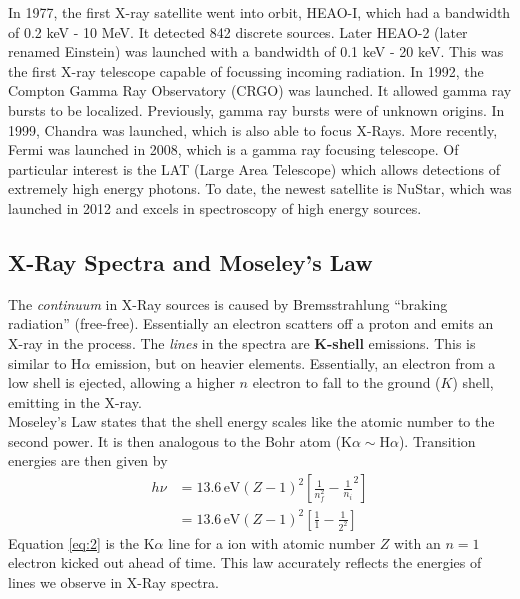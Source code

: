 \documentclass[10pt]{article}
\numberwithin{equation}{section}
\newcommand{\n}{\noindent}
\begin{document}
		\n In 1977, the first X-ray satellite went into orbit, HEAO-I, which had a bandwidth of 0.2 keV - 10 MeV. It detected 842 discrete sources. Later HEAO-2 (later renamed Einstein) was launched with a bandwidth of 0.1 keV - 20 keV. This was the first X-ray telescope capable of focussing incoming radiation. In 1992, the Compton Gamma Ray Observatory (CRGO) was launched. It allowed gamma ray bursts to be localized. Previously, gamma ray bursts were of unknown origins. In 1999, Chandra was launched, which is also able to focus X-Rays. More recently, Fermi was launched in 2008, which is a gamma ray focusing telescope. Of particular interest is the LAT (Large Area Telescope) which allows detections of extremely high energy photons. To date, the newest satellite is NuStar, which was launched in 2012 and excels in spectroscopy of high energy sources.
	\subsection{X-Ray Spectra and Moseley's Law} %
	\label{sub:x_ray_spectra}
		The \emph{continuum} in X-Ray sources is caused by Bremsstrahlung ``braking radiation'' (free-free). Essentially an electron scatters off a proton and emits an X-ray in the process. The \emph{lines} in the spectra are \textbf{K-shell} emissions. This is similar to H$\alpha$ emission, but on heavier elements. Essentially, an electron from a low shell is ejected, allowing a higher $n$ electron to fall to the ground ($K$) shell, emitting in the X-ray.\\
		
		\n Moseley's Law states that the shell energy scales like the atomic number to the second power. It is then analogous to the Bohr atom ($\mathrm{K}\alpha\sim\mathrm{H}\alpha$). Transition energies are then given by
	\begin{align}
		\label{eq:1} h\nu &= 13.6\,\mathrm{eV}(Z-1)^2\left[\frac{1}{n_f^2}-\frac{1}{n_i}^2\right]\\
		\label{eq:2}      &= 13.6\,\mathrm{eV}(Z-1)^2\left[\frac{1}{1}-\frac{1}{2^2}\right]
	\end{align}
	Equation \eqref{eq:2} is the K$\alpha$ line for a ion with atomic number $Z$ with an $n=1$ electron kicked out ahead of time. This law accurately reflects the energies of lines we observe in X-Ray spectra.
\end{document}
